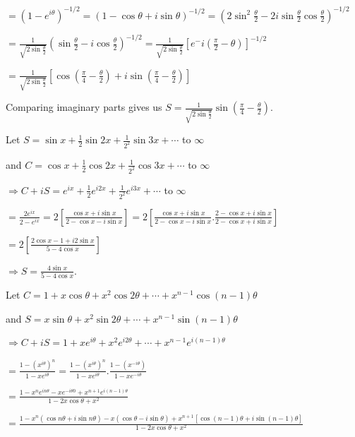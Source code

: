   $= \left(1 - e^{i\theta}\right)^{-1/2} = \left(1 - \cos\theta + i\sin\theta\right)^{-1/2} =
  \left(2\sin^2\frac{\theta}{2} - 2i\sin\frac{\theta}{2}\cos\frac{\theta}{2}\right)^{-1/2}$

  $= \frac{1}{\sqrt{2\sin\frac{\theta}{2}}}\left(\sin\frac{\theta}{2} - i\cos\frac{\theta}{2}\right)^{-1/2}
  = \frac{1}{\sqrt{2\sin\frac{\theta}{2}}}\left[e^-i\left(\frac{\pi}{2} - \theta\right)\right]^{-1/2}$

  $= \frac{1}{\sqrt{2\sin\frac{\theta}{2}}}\left[\cos\left(\frac{\pi}{4} - \frac{\theta}{2}\right) +
    i\sin\left(\frac{\pi}{4} - \frac{\theta}{2}\right)\right]$

  Comparing imaginary parts gives us $S = \frac{1}{\sqrt{2\sin\frac{\theta}{2}}}\sin\left(\frac{\pi}{4} -
  \frac{\theta}{2}\right)$.
\item Let $S = \sin x + \frac{1}{2}\sin2x + \frac{1}{2^2}\sin3x + \cdots$ to $\infty$

  and $C = \cos x + \frac{1}{2}\cos2x + \frac{1}{2^2}\cos3x + \cdots$ to $\infty$

  $\Rightarrow C + iS = e^{ix} + \frac{1}{2}e^{i2x} + \frac{1}{2^2}e^{i3x} + \cdots$ to $\infty$

  $= \frac{2e^{ix}}{2 - e^{ix}} = 2\left[\frac{\cos x + i\sin x}{2 - \cos x - i\sin x}\right] =
  2\left[\frac{\cos x + i\sin x}{2 - \cos x - i\sin x}.\frac{2 - \cos x + i\sin x}{2 - \cos x + i\sin
      x}\right]$

  $= 2\left[\frac{2\cos x - 1 + i2\sin x}{5 - 4\cos x}\right]$

  $\Rightarrow S = \frac{4\sin x}{5 - 4\cos x}$.
\item Let $C = 1 + x\cos\theta + x^2\cos2\theta + \cdots + x^{n - 1}\cos(n - 1)\theta$

  and $S = x\sin\theta + x^2\sin2\theta + \cdots + x^{n - 1}\sin(n - 1)\theta$

  $\Rightarrow C + iS = 1 + xe^{i\theta} + x^2e^{i2\theta} + \cdots + x^{n - 1}e^{i(n - 1)\theta}$

  $= \frac{1 - \left(x^{i\theta}\right)^n}{1 - xe^{i\theta}} = \frac{1 - \left(x^{i\theta}\right)^n}{1 -
    xe^{i\theta}}.\frac{1 - \left(x^{-i\theta}\right)}{1 - xe^{-i\theta}}$

  $= \frac{1 - x^ne^{in\theta} - xe^{-i\theta0} + x^{n + 1}e^{i(n - 1)\theta}}{1 - 2x\cos\theta + x^2}$

  $= \frac{1 - x^n(\cos n\theta + i\sin n\theta) - x(\cos\theta - i\sin\theta) + x^{n + 1}[\cos(n - 1)\theta
      + i\sin(n - 1)\theta]}{1 - 2x\cos\theta + x^2}$

